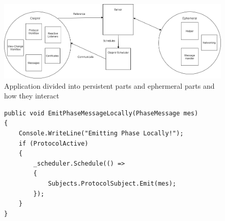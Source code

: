 \begin{figure}[H]
	\includegraphics[width=\linewidth]{figures/CleipnirStructure}
	\caption{Application divided into persistent parts and ephermeral parts and how they interact}
	\label{fig:PersistencyEphemeral}
\end{figure}

\begin{figure}[h]
	\centering
	\begin{lstlisting}[label = code:schedulerEmit, caption= Example of server and protocol interaction using Cleipnir scheduler, captionpos=b, basicstyle=\scriptsize]
public void EmitPhaseMessageLocally(PhaseMessage mes)
{
    Console.WriteLine("Emitting Phase Locally!");
    if (ProtocolActive)
    {
        _scheduler.Schedule(() =>
        {
            Subjects.ProtocolSubject.Emit(mes);
        });   
    }
}
	\end{lstlisting}
\end{figure}
